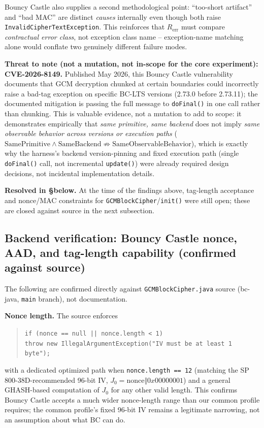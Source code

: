 \documentclass[11pt,a4paper]{article}
\begin{document}
Bouncy Castle also supplies a second methodological point: ``too-short artifact'' and ``bad MAC'' are distinct \emph{causes} internally even though both raise \texttt{InvalidCipherTextException}. This reinforces that $R_{\text{err}}$ must compare \emph{contractual error class}, not exception class name -- exception-name matching alone would conflate two genuinely different failure modes.

\textbf{Threat to note (not a mutation, not in-scope for the core experiment): CVE-2026-8149.} Published May 2026, this Bouncy Castle vulnerability documents that GCM decryption chunked at certain boundaries could incorrectly raise a bad-tag exception on specific BC-LTS versions (2.73.0 before 2.73.11); the documented mitigation is passing the full message to \texttt{doFinal()} in one call rather than chunking. This is valuable evidence, not a mutation to add to scope: it demonstrates empirically that \emph{same primitive, same backend} does not imply \emph{same observable behavior across versions or execution paths} ($\text{SamePrimitive} \land \text{SameBackend} \not\Rightarrow \text{SameObservableBehavior}$), which is exactly why the harness's backend version-pinning and fixed execution path (single \texttt{doFinal()} call, not incremental \texttt{update()}) were already required design decisions, not incidental implementation details.

\textbf{Resolved in \S below.} At the time of the findings above, tag-length acceptance and nonce/MAC constraints for \texttt{GCMBlockCipher}/\texttt{init()} were still open; these are closed against source in the next subsection.

\subsection{Backend verification: Bouncy Castle nonce, AAD, and tag-length capability (confirmed against source)}
The following are confirmed directly against \texttt{GCMBlockCipher.java} source (bc-java, \texttt{main} branch), not documentation.

\textbf{Nonce length.} The source enforces
\begin{quote}
\texttt{if (nonce == null || nonce.length < 1)}\\
\texttt{throw new IllegalArgumentException("IV must be at least 1 byte");}
\end{quote}
with a dedicated optimized path when \texttt{nonce.length == 12} (matching the SP 800-38D-recommended 96-bit IV, $J_0 = \text{nonce}\Vert 0x00000001$) and a general GHASH-based computation of $J_0$ for any other valid length. This confirms Bouncy Castle accepts a much wider nonce-length range than our common profile requires; the common profile's fixed 96-bit IV remains a legitimate narrowing, not an assumption about what BC can do.
\end{document}
